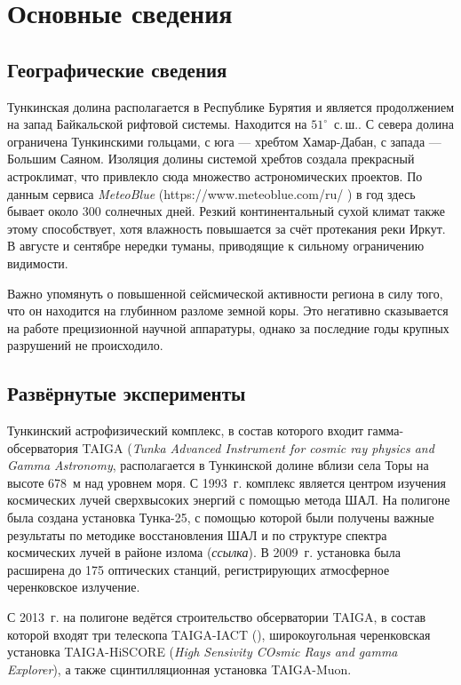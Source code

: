 \documentclass[magd,floatypics,numeref]{msudipl} %
\begin{document}
\section{Основные сведения}
\subsection{Географические сведения}
Тункинская долина располагается в Республике Бурятия и является продолжением на запад Байкальской рифтовой системы.  Находится на $51^{\circ}$~с.\,ш.. С севера долина ограничена Тункинскими гольцами, с юга --- хребтом Хамар-Дабан, с запада --- Большим Саяном. Изоляция долины системой хребтов создала прекрасный астроклимат, что привлекло сюда множество астрономических проектов. По данным сервиса \textit{MeteoBlue} (https://www.meteoblue.com/ru/%
)
в год здесь бывает около 300 солнечных дней. Резкий континентальный сухой климат также этому способствует, хотя влажность повышается за счёт протекания реки Иркут. В августе и сентябре нередки туманы, приводящие к сильному ограничению видимости. 

Важно упомянуть о повышенной сейсмической активности региона в силу того, что он находится на глубинном разломе земной коры. Это негативно сказывается на работе прецизионной научной аппаратуры, однако за последние годы крупных разрушений не происходило.
\subsection{Развёрнутые эксперименты}
Тункинский астрофизический комплекс, в состав которого входит гамма-обсерватория TAIGA (\textit{Tunka Advanced Instrument for cosmic ray physics and Gamma Astronomy}, располагается в Тункинской долине вблизи села Торы на высоте 678~м над уровнем моря. С 1993~г. комплекс является центром изучения космических лучей сверхвысоких энергий с помощью метода ШАЛ. На полигоне была создана установка Тунка-25, с помощью которой были получены важные результаты по методике восстановления ШАЛ и по структуре спектра космических лучей в районе излома (\textit{ссылка}). В 2009~г. установка была расширена до 175 оптических станций, регистрирующих атмосферное черенковское излучение. 

С 2013~г. на полигоне ведётся строительство обсерватории TAIGA, в состав которой входят три телескопа TAIGA-IACT (), широкоугольная черенковская установка TAIGA-HiSCORE (\textit{High Sensivity COsmic Rays and gamma Explorer}), а также сцинтилляционная установка TAIGA-Muon.
\end{document}
